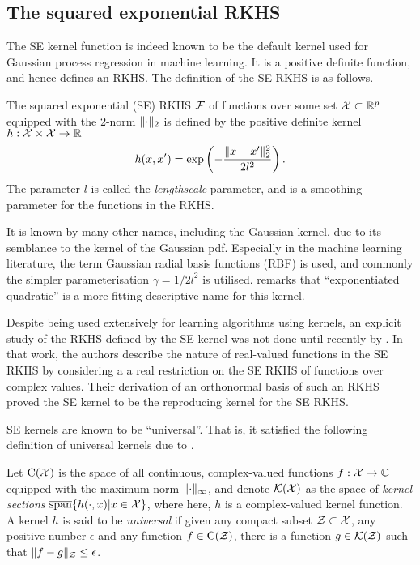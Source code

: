 \documentclass[a4paper,showframe,11pt,draft]{report}
\begin{document}
\subsection{The squared exponential RKHS}

The \gls{SE} kernel function is indeed known to be the default kernel used for Gaussian process regression in machine learning.
It is a positive definite function, and hence defines an RKHS.
The definition of the \gls{SE} RKHS is as follows.

\begin{definition}
  The squared exponential (SE) RKHS ${\mathcal F}$ of functions over some set ${\mathcal X} \subset \mathbb{R}^p$ equipped with the 2-norm $\lVert\cdot\rVert_2$ is defined by the positive definite kernel $h:{\mathcal X}\times{\mathcal X}\to\mathbb{R}$ 
  \[
    h(x,x') = \exp\left(-\frac{\lVert x-x'\rVert_2^2}{2l^2} \right).
  \]
  The parameter $l$ is called the \emph{lengthscale} parameter, and is a smoothing parameter for the functions in the RKHS.
\end{definition}

It is known by many other names, including the Gaussian kernel, due to its semblance to the kernel of the Gaussian pdf. 
Especially in the machine learning literature, the term Gaussian radial basis functions (RBF) is used, and commonly the simpler parameterisation $\gamma = 1 / 2l^2$ is utilised.
\citet{duvenaud2014automatic} remarks that ``exponentiated quadratic'' is a more fitting descriptive name for this kernel.

Despite being used extensively for learning algorithms using kernels, an explicit study of the RKHS defined by the SE kernel was not done until recently by \citet{steinwart2006explicit}.
In that work, the authors describe the nature of real-valued functions in the SE RKHS by considering a a real restriction on the SE RKHS of functions over complex values.
Their derivation of an orthonormal basis of such an RKHS proved the SE kernel to be the reproducing kernel for the SE RKHS.


SE kernels are known to be ``universal''. That is, it satisfied the following definition of universal kernels due to \citet{micchelli2006universal}.

\begin{definition}
  Let $\text{C}({\mathcal X})$ is the space of all continuous, complex-valued functions $f:{\mathcal X}\to\mathbb{C}$ equipped with the maximum norm $\lVert\cdot\rVert_\infty$, and denote ${\mathcal K}({\mathcal X})$ as the space of \emph{kernel sections} $ \overline{\text{span}}\{ h(\cdot,x) | x \in {\mathcal X} \}$, where here, $h$ is a complex-valued kernel function.
  A kernel $h$ is said to be \emph{universal} if given any compact subset ${\mathcal Z} \subset {\mathcal X}$, any positive number $\epsilon$ and any function $f \in \text{C}({\mathcal Z})$, there is a function $g \in {\mathcal K}({\mathcal Z})$ such that $\lVert f-g\rVert_{\mathcal Z} \leq \epsilon$.
\end{definition}
\end{document}
